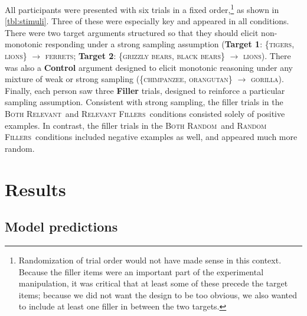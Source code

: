 \documentclass[doc,12pt]{apa}
\newcommand{\category}[1]{\textsc{#1}}
\newcommand{\relevant}{\textsc{Both Relevant}}
\newcommand{\relevantdata}{\textsc{Relevant Fillers}}
\newcommand{\randomdata}{\textsc{Random Fillers}}
\newcommand{\random}{\textsc{Both Random}}
\newcommand{\twoargument}[3]{\{{#1}, {#2}\} $\rightarrow$ {#3}}
\begin{document}
All participants were presented with six trials in a fixed order,\footnote{Randomization of trial order would not have made sense in this context. Because the filler items were an important part of the experimental manipulation, it was critical that at least some of these precede the target items; because we did not want the design to be too obvious, we also wanted to include at least one filler in between the two targets.%
} as shown in \cref{tbl:stimuli}. Three of these were especially key and appeared in all conditions. There were two target arguments structured so that they should elicit non-monotonic responding under a strong sampling assumption ({\bf Target 1}: \twoargument{\category{tigers}}{\category{lions}}{\category{ferrets}}; {\bf Target 2}: \twoargument{\category{grizzly bears}}{\category{black bears}}{\category{lions}}). There was also a {\bf Control} argument designed to elicit monotonic reasoning under any mixture of weak or strong sampling (\twoargument{\category{chimpanzee}}{\category{orangutan}}{\category{gorilla}}).%
Finally, each person saw three {\bf Filler} trials, designed to reinforce a particular sampling assumption.  Consistent with strong sampling, the filler trials in the \relevant\ and \relevantdata\ conditions consisted solely of positive examples. In contrast, the filler trials in the \random\ and \randomdata\ conditions included negative examples as well, and appeared much more random.

\section{Results}

\subsection{Model predictions}

\end{document}

